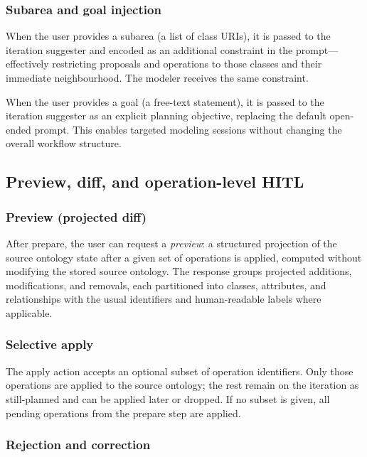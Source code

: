 \documentclass{article}
\begin{document}
\subsubsection{Subarea and goal injection}

When the user provides a subarea (a list of class URIs), it is passed to the iteration suggester and encoded as an additional constraint in the prompt---effectively restricting proposals and operations to those classes and their immediate neighbourhood. The modeler receives the same constraint.

When the user provides a goal (a free-text statement), it is passed to the iteration suggester as an explicit planning objective, replacing the default open-ended prompt. This enables targeted modeling sessions without changing the overall workflow structure.

\subsection{Preview, diff, and operation-level HITL}
\label{sec:hitl-a}

\subsubsection{Preview (projected diff)}

After prepare, the user can request a \emph{preview}: a structured projection of the source ontology state after a given set of operations is applied, computed without modifying the stored source ontology. The response groups projected additions, modifications, and removals, each partitioned into classes, attributes, and relationships with the usual identifiers and human-readable labels where applicable.

\subsubsection{Selective apply}

The apply action accepts an optional subset of operation identifiers. Only those operations are applied to the source ontology; the rest remain on the iteration as still-planned and can be applied later or dropped. If no subset is given, all pending operations from the prepare step are applied.

\subsubsection{Rejection and correction}
\end{document}

